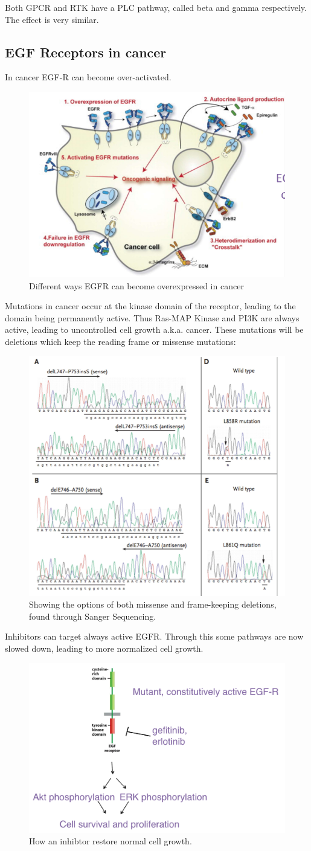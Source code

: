 \documentclass[../main.tex]{subfiles}
\begin{document}
Both GPCR and RTK have a PLC pathway, called beta and gamma respectively. The effect is very similar.


\subsection{EGF Receptors in cancer}

In cancer EGF-R can become over-activated.

\begin{figure}[H]
	\centering
	\includegraphics[width=0.4\linewidth]{EGF_canc}
	\caption{Different ways EGFR can become overexpressed in cancer}
\end{figure}

Mutations in cancer occur at the kinase domain of the receptor, leading to the domain being permanently active. Thus Ras-MAP Kinase and PI3K are always active, leading to uncontrolled cell growth a.k.a. cancer. These mutations will be deletions which keep the reading frame or missense mutations:
\begin{figure}[H]
	\centering
	\includegraphics[width=0.4\linewidth]{EGF_muta}
	\caption{Showing the options of both missense and frame-keeping deletions, found through Sanger Sequencing.}
\end{figure}

Inhibitors can target always active EGFR. Through this some pathways are now slowed down, leading to more normalized cell growth.
\begin{figure}[H]
	\centering
	\includegraphics[width=0.4\linewidth]{EGF_inhi}
	\caption{How an inhibtor restore normal cell growth.}
\end{figure}
\end{document}
